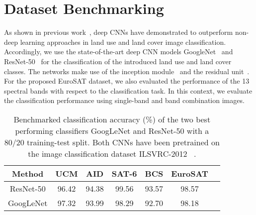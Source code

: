 \documentclass[journal]{IEEEtran}
\begin{document}


\section{Dataset Benchmarking}
As shown in previous work~\cite{castelluccio2015land, luus2015multiview, marmanis2016deep, nogueira2017towards}, deep CNNs have demonstrated to outperform non-deep learning approaches in land use and land cover image classification. Accordingly, we use the state-of-the-art deep CNN models GoogleNet~\cite{szegedy2015going} and ResNet-50~\cite{he2016deep, he2016identity} for the classification of the introduced land use and land cover classes. The networks make use of the inception module~\cite{szegedy2015going,szegedy2016rethinking, szegedy2016inception, lin2013network} and the residual unit~\cite{he2016deep, he2016identity}. For the proposed EuroSAT dataset, we also evaluated the performance of the 13 spectral bands with respect to the classification task. In this context, we evaluate the classification performance using single-band and band combination images.


\begin{table}[!h]
\centering
\caption{Benchmarked classification accuracy (\%) of the two best performing classifiers GoogLeNet and ResNet-50 with a 80/20 training-test split. Both CNNs have been pretrained on the image classification dataset ILSVRC-2012 ~\cite{ILSVRC15}.}
\begin{tabular}{|c|c|c|c|c|c|c|} 
    \hline
    \textbf{Method} & \textbf{UCM} & \textbf{AID} & \textbf{SAT-6} & \textbf{BCS} & \textbf{EuroSAT}\\
    \hline
    ResNet-50 & 96.42 & 94.38 & 99.56 & 93.57 & 98.57\\
    \hline
    GoogLeNet & 97.32 & 93.99 & 98.29 & 92.70 & 98.18\\

    
    
    
\hline
\end{tabular}
\label{table:dataset_accuracies}
\end{table}
\end{document}
